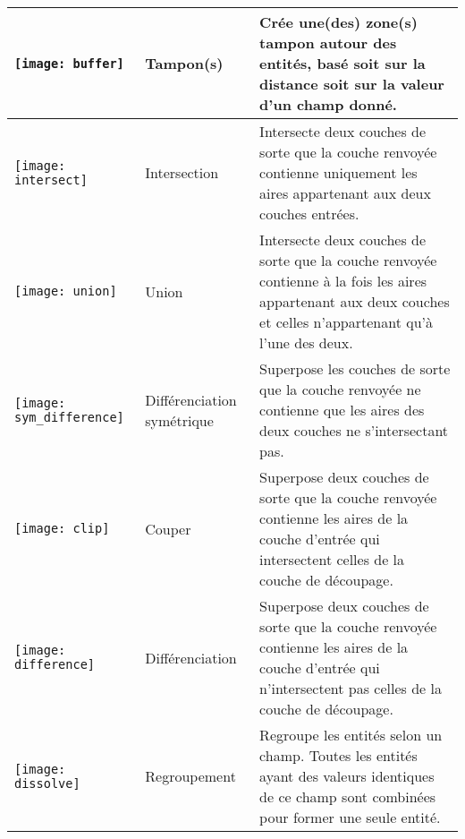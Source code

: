 \begin{table}[ht]
\begin{tabular}{|p{0.3in}|p{0.8in}|p{5.1in}|}
 \hline \texttt{[image: buffer]} & Tampon(s) & Crée une(des) zone(s) tampon autour des entités, basé soit sur la distance soit sur la valeur d'un champ donné. \\
 \hline \texttt{[image: intersect]} & Intersection & Intersecte deux couches de sorte que la couche renvoyée contienne uniquement les aires appartenant aux deux couches entrées. \\
 \hline \texttt{[image: union]} & Union & Intersecte deux couches de sorte que la couche renvoyée contienne à la fois les aires appartenant aux deux couches et celles n'appartenant qu'à l'une des deux. \\
 \hline \texttt{[image: sym\_difference]} & Différenciation symétrique & Superpose les couches de sorte que la couche renvoyée ne contienne que les aires des deux couches ne s'intersectant pas. \\
 \hline \texttt{[image: clip]} & Couper & Superpose deux couches de sorte que la couche renvoyée contienne les aires de la couche d'entrée qui intersectent celles de la couche de découpage. \\
 \hline \texttt{[image: difference]} & Différenciation & Superpose deux couches de sorte que la couche renvoyée contienne les aires de la couche d'entrée qui n'intersectent pas celles de la couche de découpage. \\
 \hline \texttt{[image: dissolve]} & Regroupement & Regroupe les entités selon un champ. Toutes les entités ayant des valeurs identiques de ce champ sont combinées pour former une seule entité. \\
 \hline
\end{tabular}
\end{table}

